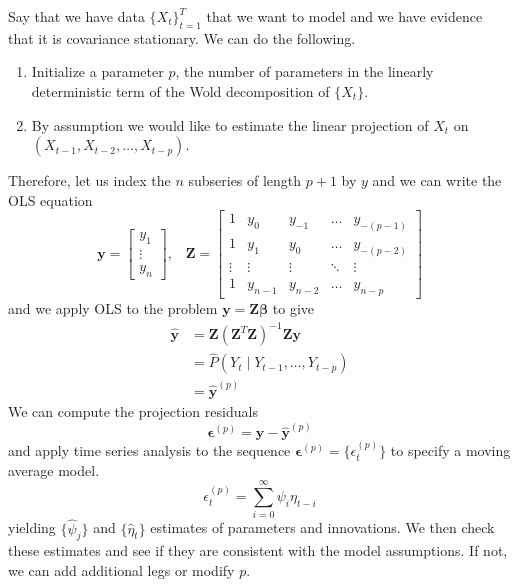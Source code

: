 \documentclass{article}
\begin{document}
  \begin{example}
    \label{ex:construction-on-dataset}
    Say that we have data $\{X_t\}_{t=1}^T$ that we want to model and we have evidence that it is covariance stationary. We can do the following. 
    \begin{enumerate}
      \item Initialize a parameter $p$, the number of parameters in the linearly deterministic term of the Wold decomposition of $\{X_t\}$. 
      \item By assumption we would like to estimate the linear projection of $X_t$ on $(X_{t-1}, X_{t-2}, \ldots, X_{t-p})$. 
    \end{enumerate}
    Therefore, let us index the $n$ subseries of length $p+1$ by $y$ and we can write the OLS equation 
    \begin{equation}
      \mathbf{y} = \begin{bmatrix} y_1 \\ \vdots \\ y_n \end{bmatrix}, \;\;\; \mathbf{Z} = \begin{bmatrix} 
        1 & y_0 & y_{-1} & \ldots & y_{-(p-1)} \\
        1 & y_1 & y_{0} & \ldots & y_{-(p-2)} \\
        \vdots & \vdots & \vdots & \ddots & \vdots \\ 
        1 & y_{n-1} & y_{n-2} & \ldots & y_{n-p}
      \end{bmatrix}
    \end{equation}
    and we apply OLS to the problem $\mathbf{y} = \mathbf{Z} \boldsymbol{\beta}$ to give 
    \begin{align}
      \hat{\mathbf{y}} & = \mathbf{Z} (\mathbf{Z}^T \mathbf{Z})^{-1} \mathbf{Z} \mathbf{y} \\
                       & = \hat{P}(Y_t \mid Y_{t-1}, \ldots, Y_{t-p}) \\
                       & = \hat{\mathbf{y}}^{(p)}
    \end{align}
    We can compute the projection residuals 
    \begin{equation}
      \boldsymbol{\epsilon}^{(p)} = \mathbf{y} - \hat{\mathbf{y}}^{(p)}
    \end{equation}
    and apply time series analysis to the sequence $\boldsymbol{\epsilon}^{(p)} = \{ \epsilon^{(p)}_t \}$ to specify a moving average model. 
    \begin{equation}
      \epsilon^{(p)}_t = \sum_{i=0}^\infty \psi_i \eta_{t-i}
    \end{equation}
    yielding $\{\hat{\psi}_j\}$ and $\{\hat{\eta}_t \}$ estimates of parameters and innovations. We then check these estimates and see if they are consistent with the model assumptions. If not, we can add additional legs or modify $p$. 
  \end{example}
\end{document}

